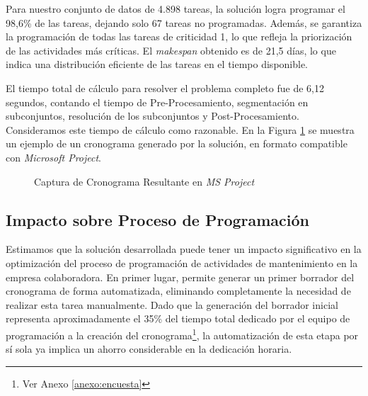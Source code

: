 \documentclass{article}
\begin{document}
Para nuestro conjunto de datos de 4.898 tareas, la solución logra programar el 98,6\% de las tareas, dejando solo 67 tareas no programadas. Además, se garantiza la programación de todas las tareas de criticidad 1, lo que refleja la priorización de las actividades más críticas. El \textit{makespan} obtenido es de 21,5 días, lo que indica una distribución eficiente de las tareas en el tiempo disponible.

El tiempo total de cálculo para resolver el problema completo fue de 6,12 segundos, contando el tiempo de Pre-Procesamiento, segmentación en subconjuntos, resolución de los subconjuntos y Post-Procesamiento. Consideramos este tiempo de cálculo como razonable. En la Figura \ref{fig:gantt-project} se muestra un ejemplo de un cronograma generado por la solución, en formato compatible con \textit{Microsoft Project}.


\begin{figure}[htbp]
    \centering
    \caption{Captura de Cronograma Resultante en \textit{MS Project}}
    \label{fig:gantt-project}
  \end{figure}


\subsection{Impacto sobre Proceso de Programación}

Estimamos que la solución desarrollada puede tener un impacto significativo en la optimización del proceso de programación de actividades de mantenimiento en la empresa colaboradora. En primer lugar, permite generar un primer borrador del cronograma de forma automatizada, eliminando completamente la necesidad de realizar esta tarea manualmente. Dado que la generación del borrador inicial representa aproximadamente el 35\% del tiempo total dedicado por el equipo de programación a la creación del cronograma\footnote{Ver Anexo \ref{anexo:encuesta}}, la automatización de esta etapa por sí sola ya implica un ahorro considerable en la dedicación horaria.
\end{document}
